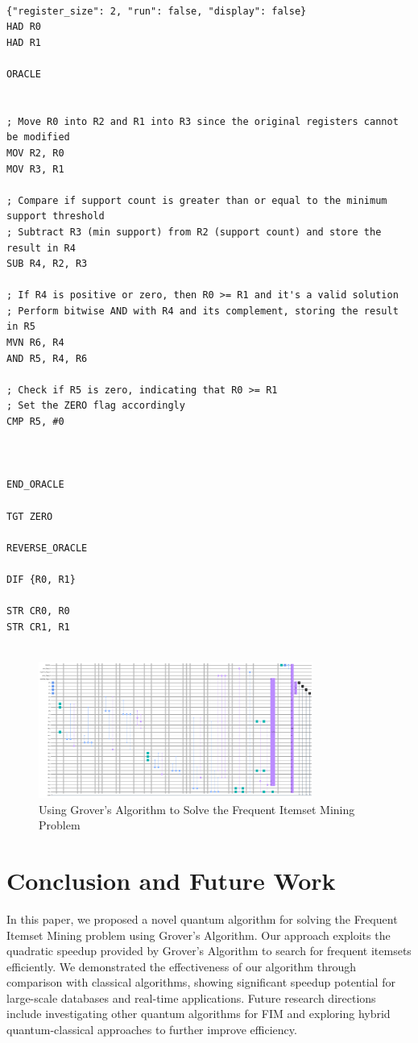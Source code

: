 \begin{lstlisting}

{"register_size": 2, "run": false, "display": false}
HAD R0
HAD R1

ORACLE


; Move R0 into R2 and R1 into R3 since the original registers cannot be modified
MOV R2, R0
MOV R3, R1

; Compare if support count is greater than or equal to the minimum support threshold
; Subtract R3 (min support) from R2 (support count) and store the result in R4
SUB R4, R2, R3

; If R4 is positive or zero, then R0 >= R1 and it's a valid solution
; Perform bitwise AND with R4 and its complement, storing the result in R5
MVN R6, R4
AND R5, R4, R6

; Check if R5 is zero, indicating that R0 >= R1
; Set the ZERO flag accordingly
CMP R5, #0



END_ORACLE

TGT ZERO

REVERSE_ORACLE

DIF {R0, R1}

STR CR0, R0
STR CR1, R1


\end{lstlisting}

\begin{figure}[htp]
    \centering
    \includegraphics[width=9cm]{Figures/Frequent_Itemset_Mining_circuit.png}
    \caption{Using Grover's Algorithm to Solve the Frequent Itemset Mining Problem}
    \label{fig:Frequent_Itemset_Mining}
\end{figure}

\section{Conclusion and Future Work}\label{sec:conclusion}

In this paper, we proposed a novel quantum algorithm for solving the Frequent Itemset Mining problem using Grover's Algorithm. Our approach exploits the quadratic speedup provided by Grover's Algorithm to search for frequent itemsets efficiently. We demonstrated the effectiveness of our algorithm through comparison with classical algorithms, showing significant speedup potential for large-scale databases and real-time applications. Future research directions include investigating other quantum algorithms for FIM and exploring hybrid quantum-classical approaches to further improve efficiency.

